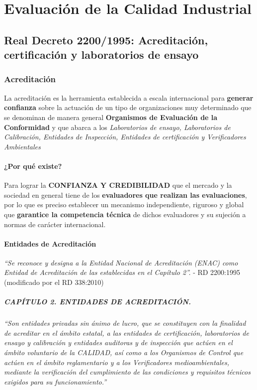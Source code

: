 \chapter{Evaluación de la Calidad Industrial}

\section{Real Decreto 2200/1995: Acreditación, certificación y laboratorios de ensayo}
\subsection{Acreditación}
La acreditación es la herramienta establecida a escala internacional para \textbf{generar confianza} sobre la actuación de un tipo de organizaciones muy determinado que se denominan de manera general \textbf{Organismos de Evaluación de la Conformidad} y que abarca a los \textit{Laboratorios de ensayo, Laboratorios de Calibración, Entidades de Inspección, Entidades de certificación y Verificadores Ambientales}

\subsubsection{¿Por qué existe?}
Para lograr la \textbf{CONFIANZA Y CREDIBILIDAD} que el mercado y la sociedad en general tiene de los \textbf{evaluadores que realizan las evaluaciones}, por lo que es preciso establecer un mecanismo independiente, riguroso y global que \textbf{garantice la competencia técnica} de dichos evaluadores y su sujeción a normas de carácter internacional.

\subsubsection{Entidades de Acreditación}
\textit{``Se reconoce y designa a la Entidad Nacional de Acreditación (ENAC) como Entidad de Acreditación de las establecidas en el Capítulo 2''.} - RD 2200:1995 (modificado por el RD 338:2010)

\paragraph{CAPÍTULO 2. ENTIDADES DE ACREDITACIÓN.} \textit{``Son entidades privadas sin ánimo de lucro, que se constituyen con la finalidad de acreditar en el ámbito estatal, a las entidades de certificación, laboratorios de ensayo y calibración y entidades auditoras y de inspección que actúen en el ámbito voluntario de la CALIDAD, así como a los Organismos de Control que actúen en el ámbito reglamentario y a los Verificadores medioambientales, mediante la verificación del cumplimiento de las condiciones y requisitos técnicos exigidos para su funcionamiento.''}

